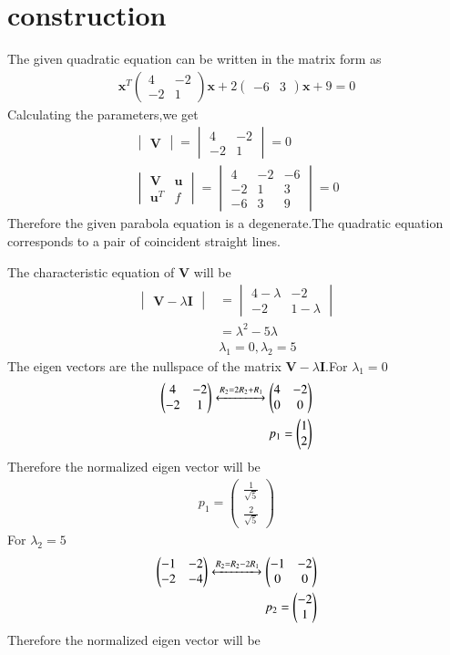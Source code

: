 \documentclass[journal,12pt,twocolumn]{IEEEtran}
\newcommand{\myvec}[1]{\ensuremath{\begin{pmatrix}#1\end{pmatrix}}}
\newcommand{\mydet}[1]{\ensuremath{\begin{vmatrix}#1\end{vmatrix}}}
\numberwithin{equation}{subsection}
\let\vec\mathbf
\begin{document}
\section{construction}
The given quadratic equation can be written in the matrix form as
\begin{align}
    \vec{x}^T\myvec{4&-2\\-2&1}\vec{x}+2\myvec{-6&3}\vec{x}+9=0\label{eq:1}
\end{align}
Calculating the parameters,we get
\begin{align}
    \mydet{\vec{V}}=\mydet{4&-2\\-2&1}=0\\
    \mydet{\vec{V}&\vec{u}\\\vec{u}^T&f}=\mydet{4&-2&-6\\-2&1&3\\-6&3&9}=0
\end{align}
Therefore the given parabola equation is a degenerate.The quadratic equation corresponds to a pair of coincident straight lines.\par
The characteristic equation of $\vec{V}$ will be
\begin{align}
    \mydet{\vec{V}-\lambda\vec{I}}&=\mydet{4-\lambda&-2\\-2&1-\lambda}\\
    &=\lambda^2-5\lambda\\
    &\lambda_1=0,\lambda_2=5
\end{align}
The eigen vectors are the nullspace of the matrix $\vec{V}-\lambda\vec{I}$.For $\lambda_1=0$
\begin{align}
    \myvec{4&-2\\-2&1}\xleftrightarrow{R_2=2R_2+R_1}\myvec{4&-2\\0&0}\\
    p_1=\myvec{1\\2}
\end{align}
Therefore the normalized eigen vector will be
\begin{align}
    p_1=\myvec{\frac{1}{\sqrt{5}}\\\frac{2}{\sqrt{5}}}
\end{align}
For $\lambda_2=5$
\begin{align}
    \myvec{-1&-2\\-2&-4}\xleftrightarrow{R_2=R_2-2R_1}\myvec{-1&-2\\0&0}\\
    p_2=\myvec{-2\\1}
\end{align}
Therefore the normalized eigen vector will be
\end{document}
